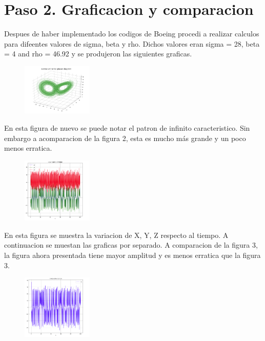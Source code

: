 \documentclass[a4paper]{article}
\begin{document}
\section{Paso 2. Graficacion y comparacion}

Despues de haber implementado los codigos de Boeing procedi a realizar calculos para difeentes valores de sigma, beta y rho. Dichos valores eran sigma = 28, beta = 4 and rho = 46.92 y se produjeron las siguientes graficas. 


\begin{figure}[ht!]
\centering
\includegraphics[width=0.3\textwidth]{A2.png}
\caption{\label{fig:}}
\end{figure}

En esta figura de nuevo se puede notar el patron de infinito caracteristico. Sin embargo a acomparacion de la figura 2, esta es mucho más grande y un poco menos erratica.

\newpage

\begin{figure}[ht!]
\centering
\includegraphics[width=0.3\textwidth]{B2.png}
\caption{\label{fig:}}
\end{figure}

En esta figura se muestra la variacion de X, Y, Z respecto al tiempo. A continuacion se muestan las graficas por separado.  A comparacion de la figura 3, la figura ahora presentada tiene mayor amplitud y es menos erratica que la figura 3.

\begin{figure}[ht!]
\centering
\includegraphics[width=0.3\textwidth]{C2.png}
\caption{\label{fig:}}
\end{figure}
\end{document}
